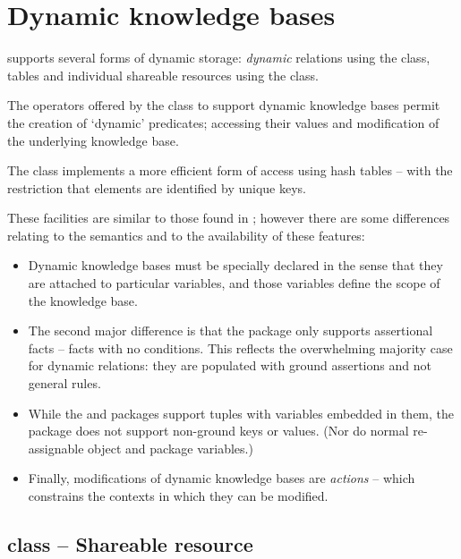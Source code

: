 \chapter{Dynamic knowledge bases}
\label{dynamic}

\go supports several forms of dynamic storage: \emph{dynamic} relations using the  class,  tables and individual shareable resources using the  class.

The operators offered by the  class to support dynamic knowledge bases permit the creation of `dynamic' predicates; accessing their values and modification of the underlying knowledge base.

The  class implements a more efficient form of access using hash tables -- with the restriction that elements are identified by unique keys.

These facilities are similar to those found in \prolog; however there are some differences relating to the semantics and to the availability of these features:

\begin{itemize}
\item
Dynamic knowledge bases must be specially declared in the sense that they are attached to particular variables, and those variables define the scope of the knowledge base.

\item
The second major difference is that the  package only supports assertional facts -- facts with no conditions. This reflects the overwhelming majority case for dynamic relations: they are populated with ground assertions and not general rules.

\item
While the  and  packages support tuples with variables embedded in them, the  package does not support non-ground keys or values. (Nor do normal re-assignable object and package variables.)

\item
Finally, modifications of dynamic knowledge bases are \emph{actions} -- which constrains the contexts in which they can be modified.
\end{itemize}

\section{ class -- Shareable resource}
\label{dynamic:cell}

